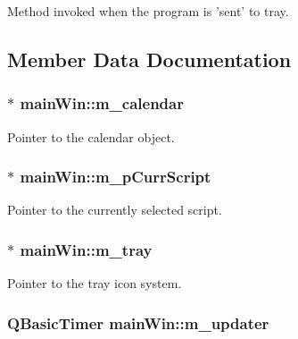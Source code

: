 Method invoked when the program is 'sent' to tray. 



\subsection{Member Data Documentation}
\hypertarget{classmain_win_a6aea2ca54243cf5eafad64ab548766d8}{
\subsubsection[{m\-\_\-calendar}]{$\ast$ main\-Win\-::m\-\_\-calendar\hspace{0.3cm}{\ttfamily [private]}}}\label{classmain_win_a6aea2ca54243cf5eafad64ab548766d8}


Pointer to the calendar object. 

\hypertarget{classmain_win_ab391602112d6c25f237da91eae815d47}{
\subsubsection[{m\-\_\-p\-Curr\-Script}]{$\ast$ main\-Win\-::m\-\_\-p\-Curr\-Script\hspace{0.3cm}{\ttfamily [private]}}}\label{classmain_win_ab391602112d6c25f237da91eae815d47}


Pointer to the currently selected script. 

\hypertarget{classmain_win_a13f687f63460e13e6a4819ea1496a2f0}{
\subsubsection[{m\-\_\-tray}]{$\ast$ main\-Win\-::m\-\_\-tray\hspace{0.3cm}{\ttfamily [private]}}}\label{classmain_win_a13f687f63460e13e6a4819ea1496a2f0}


Pointer to the tray icon system. 

\hypertarget{classmain_win_a079d09aeafe1af36f8f0d1bd4d88d803}{
\subsubsection[{m\-\_\-updater}]{\setlength{\rightskip}{0pt plus 5cm}Q\-Basic\-Timer main\-Win\-::m\-\_\-updater\hspace{0.3cm}{\ttfamily [private]}}}\label{classmain_win_a079d09aeafe1af36f8f0d1bd4d88d803}


